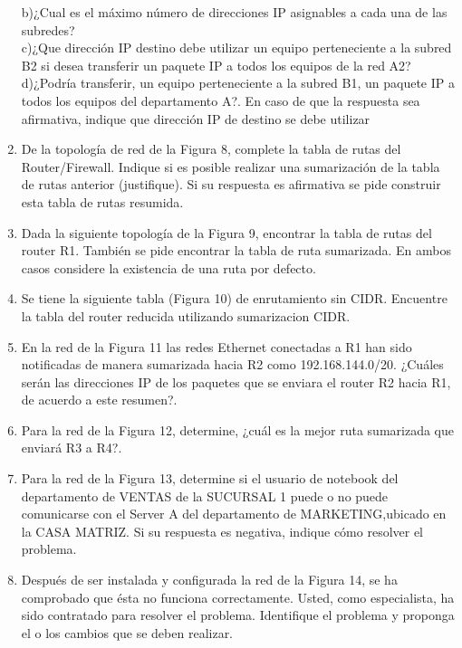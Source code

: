 \documentclass{udparticle}
\begin{document}
\begin{enumerate}
b)¿Cual es el máximo número de direcciones IP asignables a cada una de las subredes?\\

c)¿Que dirección IP destino debe utilizar un equipo perteneciente a la subred B2 si
desea transferir un paquete IP a todos los equipos de la red A2?\\

d)¿Podría transferir, un equipo perteneciente a la subred B1, un paquete IP a todos
los equipos del departamento A?. En caso de que la respuesta sea afirmativa,
indique que dirección IP de destino se debe utilizar\\


\item De la topología de red de la Figura 8, complete la tabla de rutas del 
Router/Firewall. Indique si es posible realizar una sumarización de la tabla de 
rutas anterior (justifique). Si su respuesta es afirmativa se pide construir esta tabla de rutas resumida.

\item Dada la siguiente topología de la Figura 9, encontrar la tabla de rutas del 
router R1. También se pide encontrar la tabla de ruta sumarizada. En ambos casos 
considere la existencia de una ruta por defecto.

\item Se tiene la siguiente tabla (Figura 10) de enrutamiento sin CIDR. Encuentre 
la tabla del router reducida utilizando sumarizacion CIDR.
\item En la red de la Figura 11 las redes Ethernet conectadas a R1 han sido 
notificadas de manera sumarizada hacia R2 como 192.168.144.0/20. ¿Cuáles serán 
las direcciones IP de los paquetes que se enviara el router R2 hacia R1, de acuerdo a este resumen?.
\item Para la red de la Figura 12, determine, ¿cuál es la mejor ruta sumarizada que
enviará R3 a R4?. 

\item Para la red de la Figura 13, determine si el usuario de notebook del 
departamento de VENTAS de la SUCURSAL 1 puede o no puede comunicarse con el Server 
A del departamento de MARKETING,ubicado en la CASA MATRIZ. Si su respuesta es 
negativa, indique cómo resolver el problema.

\item Después de ser instalada y configurada la red de la Figura 14, se ha 
comprobado que ésta no funciona correctamente. Usted, como especialista, ha sido 
contratado para resolver el problema. Identifique el problema y proponga el o los 
cambios que se deben realizar.


\end{enumerate}
\end{document}
